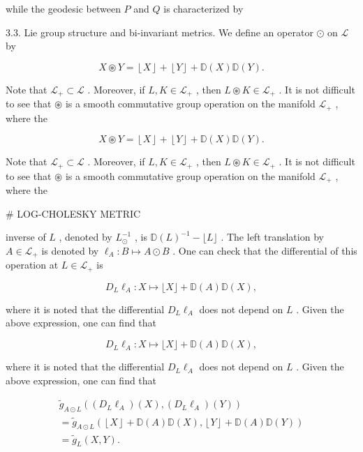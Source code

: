 \documentclass[11pt]{article}
\begin{document}
while the geodesic between  $P$  and  $Q$  is characterized by

3.3. Lie group structure and bi-invariant metrics. We define an operator  $\odot$  on  $\mathcal{L}$  by

$$
X \circledast Y = \left\lfloor X \right\rfloor + \left\lfloor Y \right\rfloor + \mathbb {D} (X) \mathbb {D} (Y).
$$

Note that  $\mathcal{L}_{+} \subset \mathcal{L}$ . Moreover, if  $L, K \in \mathcal{L}_{+}$ , then  $L \circledast K \in \mathcal{L}_{+}$ . It is not difficult to see that  $\circledast$  is a smooth commutative group operation on the manifold  $\mathcal{L}_{+}$ , where the

$$
X \circledast Y = \left\lfloor X \right\rfloor + \left\lfloor Y \right\rfloor + \mathbb {D} (X) \mathbb {D} (Y).
$$

Note that  $\mathcal{L}_{+} \subset \mathcal{L}$ . Moreover, if  $L, K \in \mathcal{L}_{+}$ , then  $L \circledast K \in \mathcal{L}_{+}$ . It is not difficult to see that  $\circledast$  is a smooth commutative group operation on the manifold  $\mathcal{L}_{+}$ , where the

# LOG-CHOLESKY METRIC

inverse of  $L$ , denoted by  $L_{\odot}^{-1}$ , is  $\mathbb{D}(L)^{-1} - \lfloor L\rfloor$ . The left translation by  $A\in \mathcal{L}_{+}$  is denoted by  $\ell_A:B\mapsto A\odot B$ . One can check that the differential of this operation at  $L\in \mathcal{L}_{+}$  is

$$
D _ {L} \ell_ {A}: X \mapsto \lfloor X \rfloor + \mathbb {D} (A) \mathbb {D} (X), \tag {3.2}
$$

where it is noted that the differential  $D_{L}\ell_{A}$  does not depend on  $L$ . Given the above expression, one can find that

$$
D _ {L} \ell_ {A}: X \mapsto \lfloor X \rfloor + \mathbb {D} (A) \mathbb {D} (X), \tag {3.2}
$$

where it is noted that the differential  $D_{L}\ell_{A}$  does not depend on  $L$ . Given the above expression, one can find that

$$
\begin{array}{l} \tilde {g} _ {A \odot L} ((D _ {L} \ell_ {A}) (X), (D _ {L} \ell_ {A}) (Y)) \\ = \tilde {g} _ {A \odot L} (\left\lfloor X \right\rfloor + \mathbb {D} (A) \mathbb {D} (X), \left\lfloor Y \right\rfloor + \mathbb {D} (A) \mathbb {D} (Y)) \\ = \tilde {g} _ {L} (X, Y). \\ \end{array}
$$
\end{document}
